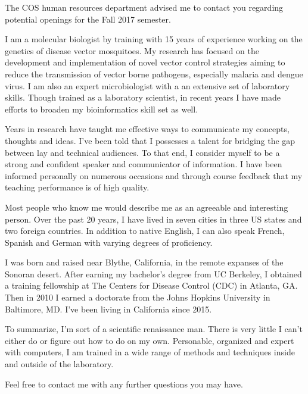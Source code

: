 


\begin{cvletter}

The COS human resources department advised me to contact you regarding potential openings for the Fall 2017 semester.

I am a molecular biologist by training with 15 years of experience working on the genetics of disease vector mosquitoes. My research has focused on the development and implementation of novel vector control strategies aiming to reduce the transmission of vector borne pathogens, especially malaria and dengue virus. I am also an expert microbiologist with a an extensive set of laboratory skills. Though trained as a laboratory scientist, in recent years I have made efforts to broaden my bioinformatics skill set as well.

Years in research have taught me effective ways to communicate my concepts, thoughts and ideas. I've been told that I possesses a talent for bridging the gap between lay and technical audiences. To that end, I consider myself to be a strong and confident speaker and communicator of information. I have been informed personally on numerous occasions and through course feedback that my teaching performance is of high quality.

Most people who know me would describe me as an agreeable and interesting person. Over the past 20 years, I have lived in seven cities in three US states and two foreign countries. In addition to native English, I can also speak French, Spanish and German with varying degrees of proficiency.

I was born and raised near Blythe, California, in the remote expanses of the Sonoran desert. After earning my bachelor's degree from UC Berkeley, I obtained a training fellowship at The Centers for Disease Control (CDC) in Atlanta, GA. Then in 2010 I earned a doctorate from the Johns Hopkins University in Baltimore, MD. I've been living in California since 2015.

To summarize, I'm sort of a scientific renaissance man. There is very little I can't either do or figure out how to do on my own. Personable, organized and expert with computers, I am trained in a wide range of methods and techniques inside and outside of the laboratory.

Feel free to contact me with any further questions you may have.

\end{cvletter}


